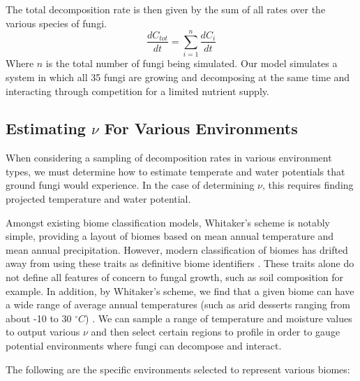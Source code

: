\documentclass[12pt]{article}
\begin{document}
\begin{multicols}{2}
The total decomposition rate is then given by the sum of all rates over the various species of fungi.
\begin{equation} \label{eq}
\frac{dC_{tot}}{dt} = \sum_{i=1}^{n}\frac{dC_{i}}{dt}
\end{equation}
Where $n$ is the total number of fungi being simulated. Our model simulates a system in which all 35 fungi are growing and decomposing at the same time and interacting through competition for a limited nutrient supply.

\subsection{Estimating $\nu$ For Various Environments}

When considering a sampling of decomposition rates in various environment types, we must determine how to estimate temperate and water potentials that ground fungi would experience. In the case of determining $\nu$, this requires finding projected temperature and water potential.

Amongst existing biome classification models, Whitaker's scheme \cite{Whittaker1970} is notably simple, providing a layout of biomes based on mean annual temperature and mean annual precipitation. However, modern classification of biomes has drifted away from using these traits as definitive biome identifiers \cite{Mucina2018}. These traits alone do not define all features of concern to fungal growth, such as soil composition for example. In addition, by Whitaker's scheme, we find that a given biome can have a wide range of average annual temperatures (such as arid desserts ranging from about -10 to 30 $^{\circ}C$) \cite{Whittaker1970}. We can sample a range of temperature and moisture values to output various $\nu$ and then select certain regions to profile in order to gauge potential environments where fungi can decompose and interact.

The following are the specific environments selected to represent various biomes:

\end{multicols}
\end{document}
